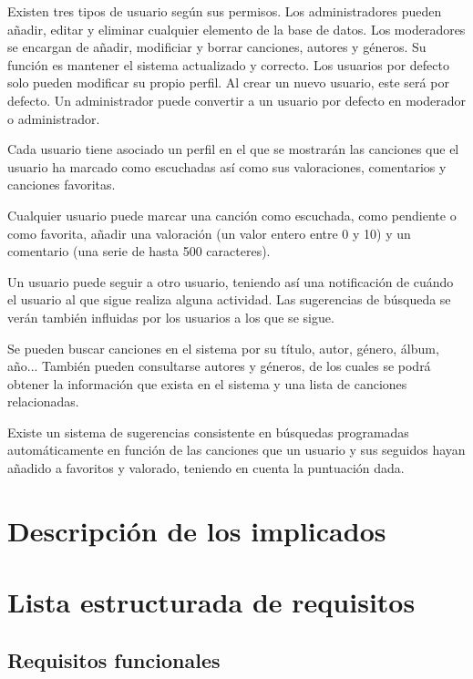 \documentclass[11pt,a4paper]{article}
\begin{document}
Existen tres tipos de usuario según sus permisos. Los administradores pueden añadir, editar y eliminar cualquier elemento de la base de datos. Los moderadores se encargan de añadir, modificiar y borrar canciones, autores y géneros. Su función es mantener el sistema actualizado y correcto. Los usuarios por defecto solo pueden modificar su propio perfil. Al crear un nuevo usuario, este será por defecto. Un administrador puede convertir a un usuario por defecto en moderador o administrador.

Cada usuario tiene asociado un perfil en el que se mostrarán las canciones que el usuario ha marcado como escuchadas así como sus valoraciones, comentarios y canciones favoritas. 


Cualquier usuario puede marcar una canción como escuchada, como pendiente o como favorita, añadir una valoración (un valor entero entre 0 y 10) y un comentario (una serie de hasta 500 caracteres). 

Un usuario puede seguir a otro usuario, teniendo así una notificación de cuándo el usuario al que sigue realiza alguna actividad. Las sugerencias de búsqueda se verán también influidas por los usuarios a los que se sigue. 



Se pueden buscar canciones en el sistema por su título, autor, género, álbum, año... También pueden consultarse autores y géneros, de los cuales se podrá obtener la información que exista en el sistema y una lista de canciones relacionadas. 

Existe un sistema de sugerencias consistente en búsquedas programadas automáticamente en función de las canciones que un usuario y sus seguidos hayan añadido a favoritos y valorado, teniendo en cuenta la puntuación dada.

\section{Descripción de los implicados} %
\label{sec:descripción_de_los_implicados}

\section{Lista estructurada de requisitos} %
\label{sec:lista_estructurada_de_requisitos}

\subsection{Requisitos funcionales}
\end{document}
